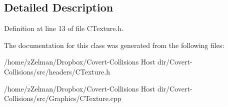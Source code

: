 \subsection{Detailed Description}


Definition at line 13 of file C\-Texture.\-h.



The documentation for this class was generated from the following files\-:\begin{DoxyCompactItemize}
\item 
/home/z\-Zelman/\-Dropbox/\-Covert-\/\-Collisions Host dir/\-Covert-\/\-Collisions/src/headers/C\-Texture.\-h\item 
/home/z\-Zelman/\-Dropbox/\-Covert-\/\-Collisions Host dir/\-Covert-\/\-Collisions/src/\-Graphics/C\-Texture.\-cpp\end{DoxyCompactItemize}
